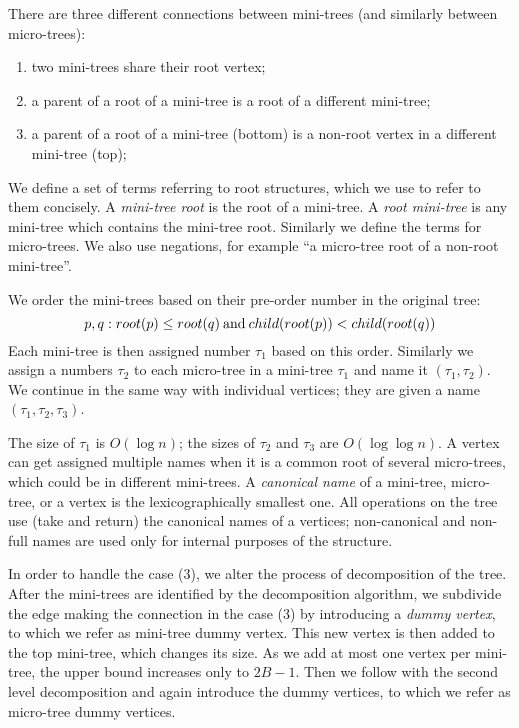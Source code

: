 There are three different connections between mini-trees (and similarly between micro-trees):
\begin{enumerate}
	\item two mini-trees share their root vertex;
	\item a parent of a root of a mini-tree is a root of a different mini-tree;
	\item a parent of a root of a mini-tree (bottom) is a non-root vertex in a different mini-tree (top);
\end{enumerate}

We define a set of terms referring to root structures, which we use to refer to them concisely.
A \emph{mini-tree root} is the root of a mini-tree.
A \emph{root mini-tree} is any mini-tree which contains the mini-tree root.
Similarly we define the terms for micro-trees.
We also use negations, for example ``a micro-tree root of a non-root mini-tree''.

We order the mini-trees based on their pre-order number in the original tree:
$$p, q: root(p) \le root(q) \mathbin{\textrm{and}} child(root(p)) < child(root(q))$$
Each mini-tree is then assigned number $\tau_1$ based on this order.
Similarly we assign a numbers $\tau_2$ to each micro-tree in a mini-tree $\tau_1$ and name it $(\tau_1, \tau_2)$.
We continue in the same way with individual vertices; they are given a name $(\tau_1, \tau_2, \tau_3)$.

The size of $\tau_1$ is $O(\log n)$; the sizes of $\tau_2$ and $\tau_3$ are $O(\log \log n)$.
A vertex can get assigned multiple names when it is a common root of several micro-trees, which could be in different mini-trees.
A \emph{canonical name} of a mini-tree, micro-tree, or a vertex is the lexicographically smallest one.
All operations on the tree use (take and return) the canonical names of a vertices; non-canonical and non-full names are used only for internal purposes of the structure.

In order to handle the case (3), we alter the process of decomposition of the tree.
After the mini-trees are identified by the decomposition algorithm, we subdivide the edge making the connection in the case (3) by introducing a \emph{dummy vertex}, to which we refer as mini-tree dummy vertex.
This new vertex is then added to the top mini-tree, which changes its size.
As we add at most one vertex per mini-tree, the upper bound increases only to $2 B - 1$.
Then we follow with the second level decomposition and again introduce the dummy vertices, to which we refer as micro-tree dummy vertices.

